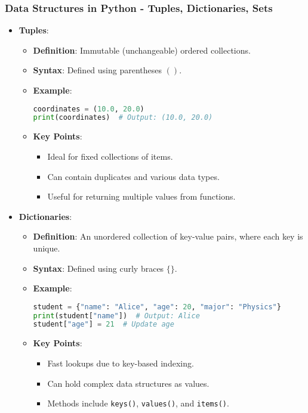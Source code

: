 \documentclass{beamer}
\begin{document}
\begin{frame}[fragile]
    \frametitle{Data Structures in Python - Tuples, Dictionaries, Sets}
    \begin{itemize}
        \item \textbf{Tuples}:
        \begin{itemize}
            \item \textbf{Definition}: Immutable (unchangeable) ordered collections.
            \item \textbf{Syntax}: Defined using parentheses $()$.
            \item \textbf{Example}:
            \begin{lstlisting}[language=Python]
coordinates = (10.0, 20.0)
print(coordinates)  # Output: (10.0, 20.0)
            \end{lstlisting}
            \item \textbf{Key Points}:
            \begin{itemize}
                \item Ideal for fixed collections of items.
                \item Can contain duplicates and various data types.
                \item Useful for returning multiple values from functions.
            \end{itemize}
        \end{itemize}

        \item \textbf{Dictionaries}:
        \begin{itemize}
            \item \textbf{Definition}: An unordered collection of key-value pairs, where each key is unique.
            \item \textbf{Syntax}: Defined using curly braces $\{\}$.
            \item \textbf{Example}:
            \begin{lstlisting}[language=Python]
student = {"name": "Alice", "age": 20, "major": "Physics"}
print(student["name"])  # Output: Alice
student["age"] = 21  # Update age
            \end{lstlisting}
            \item \textbf{Key Points}:
            \begin{itemize}
                \item Fast lookups due to key-based indexing.
                \item Can hold complex data structures as values.
                \item Methods include \texttt{keys()}, \texttt{values()}, and \texttt{items()}.
            \end{itemize}
        \end{itemize}


\end{itemize}
\end{frame}
\end{document}

